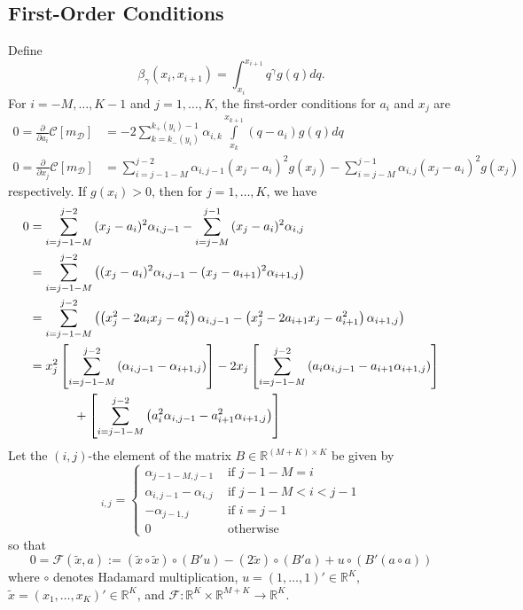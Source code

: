 \documentclass[12pt]{article}
\begin{document}
\subsection{First-Order Conditions}
Define
\begin{equation}
	\beta_{\gamma}(x_{i},x_{i+1})=\int_{x_{i}}^{x_{i+1}}{q^{\gamma}g(q)dq}.
\end{equation}
For $i=-M,\ldots,K-1$ and $j=1,\ldots,K$, the first-order conditions for $a_{i}$ and $x_{j}$ are 
\begin{align}
	0=\frac{\partial}{\partial a_{i}}\mathcal{C}[m_{\mathcal{D}}]&=-2\sum_{k=k_{-}(y_{i})}^{k_{+}(y_{i})-1}{\alpha_{i,k}\int\limits_{x_{k}}^{x_{k+1}}{(q-a_{i})g(q)dq}}\label{foc_a}\\
	0=\frac{\partial}{\partial x_{j}}\mathcal{C}[m_{\mathcal{D}}]&=\sum_{i=j-1-M}^{j-2}{\alpha_{i,j-1}(x_{j}-a_{i})^{2}g(x_{j})}-\sum_{i=j-M}^{j-1}{\alpha_{i,j}(x_{j}-a_{i})^{2}g(x_{j})}
\end{align}
respectively. If $g(x_{i})>0$, then for $j=1,\ldots,K$, we have
\begin{align}
	0&=\sum_{i=j-1-M}^{j-2}{(x_{j}-a_{i})^{2}}\alpha_{i,j-1}-\sum_{i=j-M}^{j-1}{(x_{j}-a_{i})^{2}\alpha_{i,j}}\\
	&=\sum_{i=j-1-M}^{j-2}{\left((x_{j}-a_{i})^{2}\alpha_{i,j-1}-(x_{j}-a_{i+1})^{2}\alpha_{i+1,j}\right)}\\
	&=\sum_{i=j-1-M}^{j-2}{\left(\left(x_{j}^{2}-2a_{i}x_{j}-a_{i}^{2}\right)\alpha_{i,j-1}-\left(x_{j}^{2}-2a_{i+1}x_{j}-a_{i+1}^{2}\right)\alpha_{i+1,j}\right)}\\
	&=x_{j}^{2}\left[\sum_{i=j-1-M}^{j-2}{(\alpha_{i,j-1}-\alpha_{i+1,j})}\right]-2x_{j}\left[\sum_{i=j-1-M}^{j-2}{\left(a_{i}\alpha_{i,j-1}-a_{i+1}\alpha_{i+1,j}\right)}\right]\notag\\
	&\hspace{.5in}+\left[\sum_{i=j-1-M}^{j-2}{\left(a_{i}^{2}\alpha_{i,j-1}-a_{i+1}^{2}\alpha_{i+1,j}\right)}\right]
\end{align}
Let the $(i,j)$-the element of the matrix $B\in\mathbb{R}^{(M+K)\times K}$ be given by
\begin{equation}
	[B]_{i,j}=
	\begin{cases}
		\alpha_{j-1-M,j-1} & \text{ if } j-1-M=i \\
		\alpha_{i,j-1}-\alpha_{i,j} & \text{ if } j-1-M<i<j-1 \\
		-\alpha_{j-1,j} & \text{ if } i=j-1 \\
		0 & \text{ otherwise }
	\end{cases}
\end{equation}
so that
\begin{equation}\label{eq:F_map}
	0=\mathcal{F}(\widetilde{x},a):=(\widetilde{x}\circ \widetilde{x})\circ(B'u)-(2\widetilde{x})\circ(B'a)+u\circ(B'(a\circ a))
\end{equation}
where $\circ$ denotes Hadamard multiplication, $u=(1,\ldots,1)'\in\mathbb{R}^{K}$, $\widetilde{x}=(x_{1},\ldots,x_{K})'\in\mathbb{R}^{K}$, and $\mathcal{F}:\mathbb{R}^{K}\times\mathbb{R}^{M+K}\rightarrow\mathbb{R}^{K}$.
\end{document}
